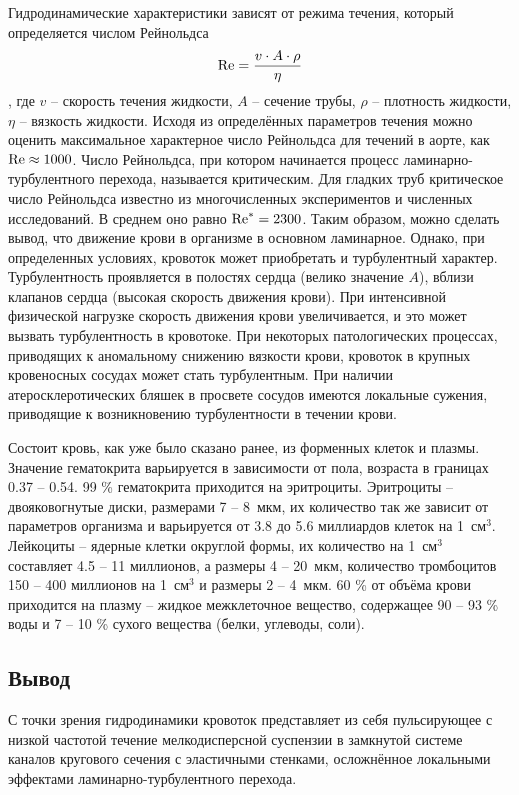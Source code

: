 Гидродинамические характеристики зависят от режима течения, который определяется числом Рейнольдса
$$\mathrm{Re}=\frac{v\cdot A\cdot \rho}{\eta}$$,
где $v$ -- скорость течения жидкости, $A$ -- сечение трубы, $\rho$ -- плотность жидкости, $\eta$ -- вязкость жидкости.
Исходя из определённых параметров течения можно оценить максимальное характерное число Рейнольдса для течений в аорте, как
$\mathrm{Re}\approx 1000 $. Число Рейнольдса, при котором начинается процесс ламинарно-турбулентного перехода, называется критическим.  
Для гладких труб критическое число Рейнольдса известно из многочисленных экспериментов и численных исследований. В среднем оно равно $\mathrm{Re}^*=2300$.
Таким образом, можно сделать вывод, что движение крови в организме в основном ламинарное. 
Однако, при определенных условиях, кровоток может приобретать и турбулентный характер.
Турбулентность проявляется в полостях сердца (велико значение $A$), вблизи клапанов сердца (высокая скорость движения крови). 
При интенсивной физической нагрузке скорость движения крови увеличивается, и это может вызвать турбулентность в кровотоке. 
При некоторых патологических процессах, приводящих к аномальному снижению вязкости крови, кровоток в крупных кровеносных сосудах может 
стать турбулентным.  При наличии атеросклеротических бляшек в просвете сосудов имеются локальные сужения, приводящие к возникновению 
турбулентности в течении крови. 


Состоит кровь, как уже было сказано ранее, из форменных клеток и плазмы. Значение гематокрита варьируется в зависимости от пола,
возраста в границах 0.37 -- 0.54. 99 \% гематокрита 
приходится на эритроциты. Эритроциты -- двояковогнутые диски, размерами 7 -- 8~мкм, их количество так же зависит
от параметров организма 
и варьируется от 3.8 до 5.6 миллиардов клеток на 1~см$^3$. 
Лейкоциты -- ядерные клетки округлой формы, их количество на 1~см$^3$ составляет 4.5 -- 11 миллионов, а размеры 4 -- 20~мкм, 
количество тромбоцитов 150 -- 400 миллионов на 1~см$^3$ и размеры 2 -- 4~мкм. 60 \% от объёма крови приходится на плазму -- жидкое межклеточное 
вещество, содержащее 90 -- 93 \% воды и 7 -- 10 \% сухого вещества (белки, углеводы, соли).

\subsection{Вывод}
 С точки зрения гидродинамики кровоток представляет из себя пульсирующее с низкой частотой течение мелкодисперсной суспензии в 
 замкнутой системе каналов кругового сечения с эластичными стенками, осложнённое локальными эффектами ламинарно-турбулентного перехода.
